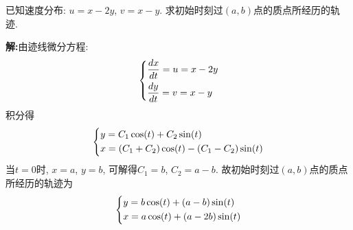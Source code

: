 \begin{problem}[问题2.1]
已知速度分布: $u=x-2y$, $v = x-y$. 求初始时刻过$(a,b)$点的质点所经历的轨迹.
\end{problem}
\begin{solution}
\textbf{解:}由迹线微分方程:
\[
\begin{dcases}
\frac{dx}{dt} = u = x-2y \\
\frac{dy}{dt} = v = x -y
\end{dcases}
\]
积分得
\[
\begin{dcases}
y = C_1\cos(t) + C_2\sin(t)\\
x = (C_1+C_2)\cos(t)  - (C_1-C_2)\sin(t)
\end{dcases}
\]
当$t=0$时, $x=a$, $y=b$, 可解得$C_1=b$, $C_2=a-b$. 故初始时刻过$(a,b)$点的质点所经历的轨迹为
\[
\begin{dcases}
y = b\cos(t) + (a-b)\sin(t)\\
x = a\cos(t) + (a-2b)\sin(t)
\end{dcases}
\]
\end{solution} 
